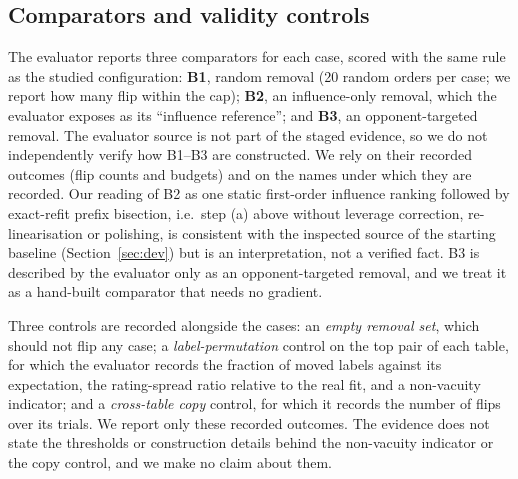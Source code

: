 \documentclass{article}
\begin{document}
\subsection{Comparators and validity controls}
The evaluator reports three comparators for each case, scored with the same rule as the studied configuration: \textbf{B1}, random removal (20 random orders per case; we report how many flip within the cap); \textbf{B2}, an influence-only removal, which the evaluator exposes as its ``influence reference''; and \textbf{B3}, an opponent-targeted removal. The evaluator source is not part of the staged evidence, so we do not independently verify how B1--B3 are constructed. We rely on their recorded outcomes (flip counts and budgets) and on the names under which they are recorded. Our reading of B2 as one static first-order influence ranking followed by exact-refit prefix bisection, i.e.\ step (a) above without leverage correction, re-linearisation or polishing, is consistent with the inspected source of the starting baseline (Section~\ref{sec:dev}) but is an interpretation, not a verified fact. B3 is described by the evaluator only as an opponent-targeted removal, and we treat it as a hand-built comparator that needs no gradient.

Three controls are recorded alongside the cases: an \emph{empty removal set}, which should not flip any case; a \emph{label-permutation} control on the top pair of each table, for which the evaluator records the fraction of moved labels against its expectation, the rating-spread ratio relative to the real fit, and a non-vacuity indicator; and a \emph{cross-table copy} control, for which it records the number of flips over its trials. We report only these recorded outcomes. The evidence does not state the thresholds or construction details behind the non-vacuity indicator or the copy control, and we make no claim about them.
\end{document}
